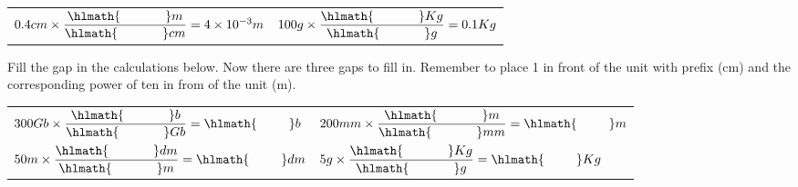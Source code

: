 \documentclass[main.tex]{subfiles}
\begin{document}
\begin{steps}
\begin{center}
\begin{tabular}{ p{6cm}   p{6cm}  }
  $0.4cm\times\dfrac{\hlmath{\hspace{35pt }}m}{\hlmath{\hspace{35pt }}cm}=4\times 10^{-3}m$				&
 $100g\times\dfrac{\hlmath{\hspace{35pt }}Kg}{\hlmath{\hspace{35pt }}g}=0.1Kg$							\\[0.5cm] 
 
 \end{tabular}\end{center}\vspace{.1cm}
   
   
      \newstep[]  Fill the gap in the calculations below. Now there are three gaps to fill in. Remember to place 1 in front of the unit with prefix (cm) and the corresponding power of ten in from of the unit (m).

\begin{center}
 \begin{tabular}{ p{6cm}   p{6cm}  }
 $300Gb\times\dfrac{\hlmath{\hspace{35pt }}b}{\hlmath{\hspace{35pt }}Gb}=\hlmath{\hspace{25pt }}b$				&
 $200mm\times\dfrac{\hlmath{\hspace{35pt }}m}{\hlmath{\hspace{35pt }}mm}=\hlmath{\hspace{25pt }}m$							\\[0.5cm]     
 
  $50m\times\dfrac{\hlmath{\hspace{35pt }}dm}{\hlmath{\hspace{35pt }}m}=\hlmath{\hspace{25pt }}dm$				&
 $5g\times\dfrac{\hlmath{\hspace{35pt }}Kg}{\hlmath{\hspace{35pt }}g}=\hlmath{\hspace{25pt }}Kg$							\\[0.5cm] 
 

\end{tabular}
\end{center}
\end{steps}
\end{document}
